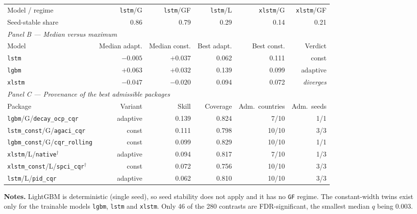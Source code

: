 \begin{table}[htbp]
\begin{tabular}{llrrrrr}
    \midrule
    \multicolumn{2}{l}{Model / regime}
      & \texttt{lstm}/G & \texttt{lstm}/GF & \texttt{lstm}/L & \texttt{xlstm}/G & \texttt{xlstm}/GF \\
    \multicolumn{2}{l}{Seed-stable share} & 0.86 & 0.79 & 0.29 & 0.14 & 0.21 \\
    \midrule
    \multicolumn{7}{l}{\emph{Panel B --- Median versus maximum}} \\
    \midrule
    \multicolumn{2}{l}{Model} & Median adapt. & Median const. & Best adapt. & Best const. & Verdict \\
    \midrule
    \multicolumn{2}{l}{\texttt{lstm}}  & $-0.005$ & $+0.037$ & 0.062 & 0.111 & const \\
    \multicolumn{2}{l}{\texttt{lgbm}}  & $+0.063$ & $+0.032$ & 0.139 & 0.099 & adaptive \\
    \multicolumn{2}{l}{\texttt{xlstm}} & $-0.047$ & $-0.020$ & 0.094 & 0.072 & \emph{diverges} \\
    \midrule
    \multicolumn{7}{l}{\emph{Panel C --- Provenance of the best admissible packages}} \\
    \midrule
    \multicolumn{2}{l}{Package} & Variant & Skill & Coverage & Adm.\ countries & Adm.\ seeds \\
    \midrule
    \multicolumn{2}{l}{\texttt{lgbm}/G/\texttt{decay\_ocp\_cqr}}      & adaptive & 0.139 & 0.824 & 7/10  & 1/1 \\
    \multicolumn{2}{l}{\texttt{lstm\_const}/G/\texttt{agaci\_cqr}}    & const    & 0.111 & 0.798 & 10/10 & 3/3 \\
    \multicolumn{2}{l}{\texttt{lgbm\_const}/G/\texttt{cqr\_rolling}}  & const    & 0.099 & 0.829 & 10/10 & 1/1 \\
    \multicolumn{2}{l}{\texttt{xlstm}/L/\texttt{native}$^\dagger$}    & adaptive & 0.094 & 0.817 & 7/10  & 1/3 \\
    \multicolumn{2}{l}{\texttt{xlstm\_const}/L/\texttt{spci\_cqr}$^\dagger$} & const & 0.072 & 0.756 & 10/10 & 3/3 \\
    \multicolumn{2}{l}{\texttt{lstm}/L/\texttt{pid\_cqr}}             & adaptive & 0.062 & 0.810 & 10/10 & 3/3 \\
    \bottomrule
  \end{tabular}
    \vspace{0.5em}
  \footnotesize\raggedright
  \textbf{Notes.} LightGBM is deterministic (single seed), so seed
  stability does not apply and it has no \texttt{GF} regime. The
  constant-width twins exist only for the trainable models
  \texttt{lgbm}, \texttt{lstm} and \texttt{xlstm}. Only 46 of the 280
  contrasts are FDR-significant, the smallest median $q$ being 0.003.
\end{table}
